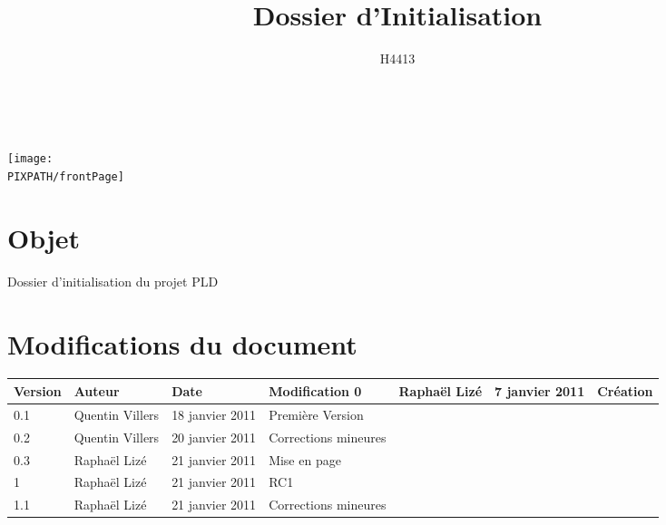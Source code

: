 \documentclass[twoside]{article}
\title{Dossier d'Initialisation}
\author{H4413}
\newcommand\PIXPATH{./docs/pics}
\newcommand\Object{Dossier d'initialisation du projet PLD}
\begin{document}



\maketitle

\thispagestyle{empty}

\hfill\\
\vfill


\begin{center}
    \texttt{[image: \\PIXPATH/frontPage]}
\end{center}

\section*{Objet}
\Object



\section*{Modifications du document}

\begin{center}
\begin{longtable}{|m{14mm}|m{36mm}|m{36mm}|m{60mm}|}
\hline
Version & Auteur & Date & Modification\endhead \hline
0
& %
Raphaël Lizé
& %
7 janvier 2011
& %
Création
\\\hline
0.1
& %
Quentin Villers
& %
18 janvier 2011
& %
Première Version
\\\hline
0.2
& %
Quentin Villers
& %
20 janvier 2011
& %
Corrections mineures
\\\hline
0.3
& %
Raphaël Lizé
& %
21 janvier 2011
& %
Mise en page
\\\hline
1
& %
Raphaël Lizé
& %
21 janvier 2011
& %
RC1
\\\hline
1.1
& %
Raphaël Lizé
& %
21 janvier 2011
& %
Corrections mineures
\\\hline
\end{longtable}
\end{center}
\end{document}
